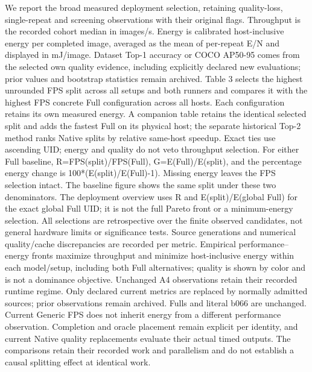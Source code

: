 We report the broad measured deployment selection, retaining quality-loss, single-repeat and screening observations with their original flags. Throughput is the recorded cohort median in images/\allowbreak{}s. Energy is calibrated host-inclusive energy per completed image, averaged as the mean of per-repeat E/\allowbreak{}N and displayed in mJ/\allowbreak{}image. Dataset Top-1 accuracy or COCO AP50-95 comes from the selected own quality evidence, including explicitly declared new evaluations; prior values and bootstrap statistics remain archived. Table 3 selects the highest unrounded FPS split across all setups and both runners and compares it with the highest FPS concrete Full configuration across all hosts. Each configuration retains its own measured energy. A companion table retains the identical selected split and adds the fastest Full on its physical host; the separate historical Top-2 method ranks Native splits by relative same-host speedup. Exact ties use ascending UID; energy and quality do not veto throughput selection. For either Full baseline, R=FPS(split)/\allowbreak{}FPS(Full), G=E(Full)/\allowbreak{}E(split), and the percentage energy change is 100*(E(split)/\allowbreak{}E(Full)-1). Missing energy leaves the FPS selection intact. The baseline figure shows the same split under these two denominators. The deployment overview uses R and E(split)/\allowbreak{}E(global Full) for the exact global Full UID; it is not the full Pareto front or a minimum-energy selection. All selections are retrospective over the finite observed candidates, not general hardware limits or significance tests. Source generations and numerical quality/\allowbreak{}cache discrepancies are recorded per metric. Empirical performance--energy fronts maximize throughput and minimize host-inclusive energy within each model/\allowbreak{}setup, including both Full alternatives; quality is shown by color and is not a dominance objective. Unchanged A4 observations retain their recorded runtime regime. Only declared current metrics are replaced by normally admitted sources; prior observations remain archived. Fulls and literal b066 are unchanged. Current Generic FPS does not inherit energy from a different performance observation. Completion and oracle placement remain explicit per identity, and current Native quality replacements evaluate their actual timed outputs. The comparisons retain their recorded work and parallelism and do not establish a causal splitting effect at identical work.
